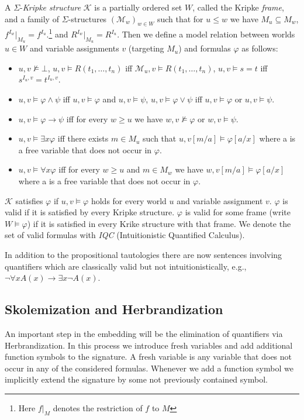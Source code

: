 \documentclass[a4paper,UKenglish,cleveref, autoref, thm-restate]{lipics-v2021}
\begin{document}
\begin{definition}
A $\Sigma$-\emph{Kripke structure} $\mathcal{K}$ is a partially ordered set $W$, called the Kripke \emph{frame}, and a family of $\Sigma$-structures $(\mathcal{M}_w)_{w\in W}$ such that for $u\leq w$ we have $M_u\subseteq M_w$, $f^{I_w}|_{M_u} = f^{I_u}$.\footnote{Here $f|_M$ denotes the restriction of $f$ to $M$} and $R^{I_w}|_{M_u} = R^{I_u}$.
	Then we define a model relation between worlds $u\in W$ and variable assignments $v$ (targeting $M_u$) and formulas $\varphi$ as follows:
	\begin{itemize}
		\item $u, v\not\models\bot$, $u, v\models R(t_1,\dots,t_n)$ iff $\mathcal M_u, v\models R(t_1,\dots,t_n)$, $u, v\models s = t$ iff $s^{I_u, v} = t^{I_u, v}$.
		\item $u, v\models \varphi\wedge \psi$ iff $u, v\models\varphi$ and $u, v\models\psi$, $u, v\models \varphi\vee\psi$ iff $u, v\models\varphi$ or $u, v\models\psi$.
		\item $u, v\models \varphi\to\psi$ iff for every $w\geq u$ we have $w, v\not\models\varphi$ or $w, v\models\psi$.
		\item $u, v\models\exists x\varphi$ iff there exists $m\in M_u$ such that $u, v[m/a]\models\varphi[a/x]$ where a is a free variable that does not occur in $\varphi$.
		\item $u, v\models\forall x\varphi$ iff for every $w\geq u$ and $m\in M_w$ we have $w, v[m/a]\models\varphi[a/x]$ where a is a free variable that does not occur in $\varphi$.
	\end{itemize}
	$\mathcal{K}$ satisfies $\varphi$ if $u, v\models\varphi$ holds for every world $u$ and variable assignment $v$. $\varphi$ is valid if it is satisfied by every Kripke structure.
$\varphi$ is valid for some frame (write $W\models\varphi$) if it is satisfied in every Krike structure with that frame. We denote the set of valid formulas with \emph{IQC} (Intuitionistic Quantified Calculus).
\end{definition}
In addition to the propositional tautologies there are now sentences involving quantifiers which are classically valid but not intuitionistically, e.g., $\neg\forall x A(x)\to \exists x \neg A(x)$.

\subsection{Skolemization and Herbrandization}

An important step in the embedding will be the elimination of quantifiers via Herbrandization.
In this process we introduce fresh variables and add additional function symbols to the signature.
A fresh variable is any variable that does not occur in any of the considered formulas.
Whenever we add a function symbol we implicitly extend the signature by some not previously contained symbol.
\end{document}
